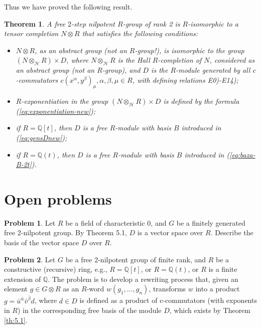 \documentclass[11pt]{article}
\newtheorem{theorem}{Theorem}[section]
\theoremstyle{definition}
\newtheorem{problem}{Problem}[section]
\begin{document}
Thus we have proved the following result.
\begin{theorem}\label{th:3.1}
A free $2$-step nilpotent $R$-group of rank 2 is $R$-isomorphic to a tensor completion $N \otimes R$ that satisfies the following conditions:
\begin{itemize}
    \item [1)] $N \otimes R$, as an abstract group (not an $R$-group!), is isomorphic to the group $(N \otimes_{\mathcal{H}} R) \times D$, where $N \otimes_{\mathcal{H}} R$ is the Hall $R$-completion of $N$, considered as an abstract group (not an $R$-group), and $D$ is the $R$-module generated by all $c$-commutators $c(x^\alpha,y^\beta)_\mu, \alpha, \beta, \mu \in R$, with defining relations E0)-E14);
    \item [2)] $R$-exponentiation  in the group $(N \otimes_{\mathcal{H}} R) \times D$ is defined by the formula (\ref{eq:exponentiation-new});
    \item [3)] if $R = \mathbb{Q}[t]$, then $D$ is a free $R$-module with basis $B$ introduced in (\ref{eq:gensDnew});
    \item [4)] if $R = \mathbb{Q}(t)$, then $D$ is a free $R$-module with basis $B$ introduced in (\ref{eq:baza-B-2t}).
\end{itemize} 
\end{theorem}







\section{Open problems}

\begin{problem}
Let $R$ be a field of characteristic 0, and $G$ be a finitely generated free 2-nilpotent group. By Theorem 5.1, $D$ is a vector space over $R$. Describe the basis of the vector space $D$ over $R$.
\end{problem}

\begin{problem}
Let $G$ be a free 2-nilpotent group of finite rank, and $R$ be a constructive (recursive) ring, e.g., $R = \mathbb{Q}[t]$, or $R = \mathbb{Q}(t)$, or $R$ is a finite extension of $\mathbb{Q}$. The problem is to develop a rewriting process that, given an element $g \in G \otimes R$ as an $R$-word $w(g_1, \ldots,g_n)$, transforms $w$ into a product $g = \bar u^{\bar\alpha}\bar v^{\bar \beta} d$, where $d \in D$ is defined as a product of c-commutators (with exponents in $R$) in the corresponding free basis of the module $D$, which exists by Theorem \ref{th:5.1}.
\end{problem}
\end{document}
